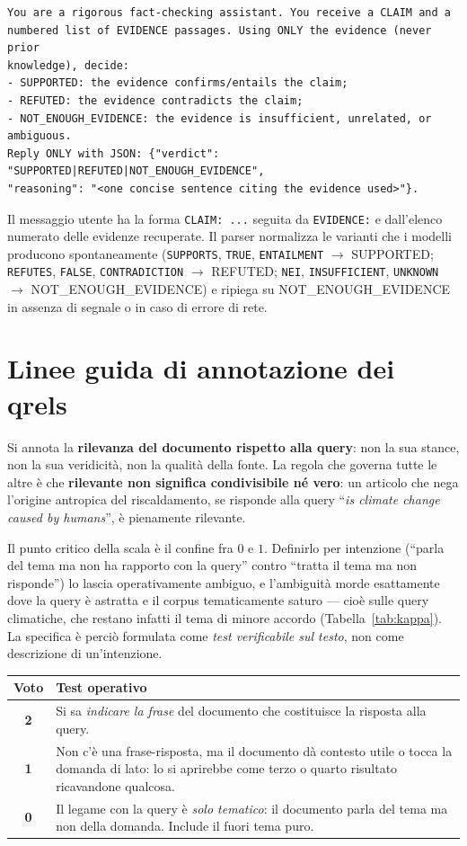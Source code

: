 \documentclass[11pt,a4paper]{report}
\begin{document}
\begin{lstlisting}
You are a rigorous fact-checking assistant. You receive a CLAIM and a
numbered list of EVIDENCE passages. Using ONLY the evidence (never prior
knowledge), decide:
- SUPPORTED: the evidence confirms/entails the claim;
- REFUTED: the evidence contradicts the claim;
- NOT_ENOUGH_EVIDENCE: the evidence is insufficient, unrelated, or ambiguous.
Reply ONLY with JSON: {"verdict": "SUPPORTED|REFUTED|NOT_ENOUGH_EVIDENCE",
"reasoning": "<one concise sentence citing the evidence used>"}.
\end{lstlisting}

Il messaggio utente ha la forma \texttt{CLAIM: ...} seguita da \texttt{EVIDENCE:} e dall'elenco
numerato delle evidenze recuperate. Il parser normalizza le varianti che i modelli producono
spontaneamente (\texttt{SUPPORTS}, \texttt{TRUE}, \texttt{ENTAILMENT} $\to$ SUPPORTED;
\texttt{REFUTES}, \texttt{FALSE}, \texttt{CONTRADICTION} $\to$ REFUTED; \texttt{NEI},
\texttt{INSUFFICIENT}, \texttt{UNKNOWN} $\to$ NOT\_ENOUGH\_EVIDENCE) e ripiega su
NOT\_ENOUGH\_EVIDENCE in assenza di segnale o in caso di errore di rete.

\chapter{Linee guida di annotazione dei qrels}\label{app:qrels}
Si annota la \textbf{rilevanza del documento rispetto alla query}: non la sua stance, non la sua
veridicità, non la qualità della fonte. La regola che governa tutte le altre è che
\textbf{rilevante non significa condivisibile né vero}: un articolo che nega l'origine antropica
del riscaldamento, se risponde alla query ``\emph{is climate change caused by humans}'', è
pienamente rilevante.

Il punto critico della scala è il confine fra $0$ e $1$. Definirlo per intenzione (``parla del tema
ma non ha rapporto con la query'' contro ``tratta il tema ma non risponde'') lo lascia
operativamente ambiguo, e l'ambiguità morde esattamente dove la query è astratta e il corpus
tematicamente saturo --- cioè sulle query climatiche, che restano infatti il tema di minore accordo
(Tabella~\ref{tab:kappa}). La specifica è perciò formulata come \emph{test verificabile sul testo},
non come descrizione di un'intenzione.

\begin{center}
\small
\begin{tabularx}{\textwidth}{cX}
\toprule
\textbf{Voto} & \textbf{Test operativo} \\
\midrule
\textbf{2} & Si sa \emph{indicare la frase} del documento che costituisce la risposta alla query. \\
\textbf{1} & Non c'è una frase-risposta, ma il documento dà contesto utile o tocca la domanda di
lato: lo si aprirebbe come terzo o quarto risultato ricavandone qualcosa. \\
\textbf{0} & Il legame con la query è \emph{solo tematico}: il documento parla del tema ma non della
domanda. Include il fuori tema puro. \\
\bottomrule
\end{tabularx}
\end{center}
\end{document}
